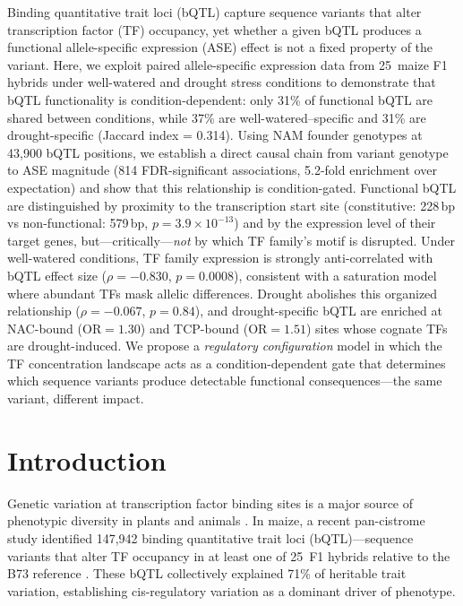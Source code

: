 \documentclass[10pt,letterpaper]{article}
\begin{document}
Binding quantitative trait loci (bQTL) capture sequence variants that alter
transcription factor (TF) occupancy, yet whether a given bQTL produces a
functional allele-specific expression (ASE) effect is not a fixed property of
the variant. Here, we exploit paired allele-specific expression data from
25~maize F1 hybrids under well-watered and drought stress conditions to
demonstrate that bQTL functionality is condition-dependent: only 31\% of
functional bQTL are shared between conditions, while 37\% are well-watered--specific
and 31\% are drought-specific (Jaccard index = 0.314). Using NAM founder
genotypes at 43,900 bQTL positions, we establish a direct causal chain from
variant genotype to ASE magnitude (814 FDR-significant associations, 5.2-fold
enrichment over expectation) and show that this relationship is
condition-gated. Functional bQTL are distinguished by proximity to the
transcription start site (constitutive: 228\,bp vs non-functional: 579\,bp,
$p = 3.9 \times 10^{-13}$) and by the expression level of their target genes,
but---critically---\emph{not} by which TF family's motif is disrupted. Under
well-watered conditions, TF family expression is strongly anti-correlated with
bQTL effect size ($\rho = -0.830$, $p = 0.0008$), consistent with a saturation
model where abundant TFs mask allelic differences. Drought abolishes this
organized relationship ($\rho = -0.067$, $p = 0.84$), and drought-specific
bQTL are enriched at NAC-bound ($\text{OR} = 1.30$) and TCP-bound
($\text{OR} = 1.51$) sites whose cognate TFs are drought-induced. We propose a
\emph{regulatory configuration} model in which the TF concentration landscape
acts as a condition-dependent gate that determines which sequence variants
produce detectable functional consequences---the same variant, different
impact.


\section*{Introduction}

Genetic variation at transcription factor binding sites is a major source of
phenotypic diversity in plants and animals \cite{engelhorn2025,peleke2024}.
In maize, a recent pan-cistrome study identified 147,942 binding quantitative
trait loci (bQTL)---sequence variants that alter TF occupancy in at least one
of 25~F1 hybrids relative to the B73 reference \cite{engelhorn2025}. These
bQTL collectively explained 71\% of heritable trait variation, establishing
cis-regulatory variation as a dominant driver of phenotype.
\end{document}
